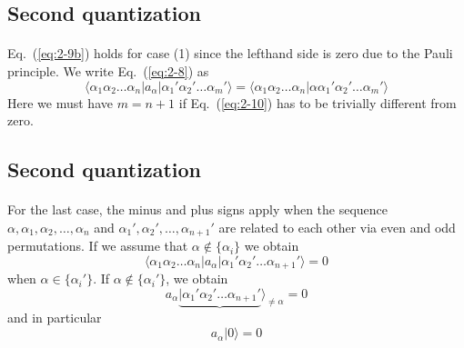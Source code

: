 \documentclass[%
twoside,                 %
final,                   %
10pt]{article}
\begin{document}
\subsection*{Second quantization}

\paragraph{}
Eq.~(\ref{eq:2-9b}) holds for case (1) since the lefthand side is zero due to the Pauli principle. We write
Eq.~(\ref{eq:2-8}) as
\begin{equation}
	\langle\alpha_1\alpha_2 \dots \alpha_n|a_\alpha|\alpha_1'\alpha_2' \dots \alpha_m'\rangle = 
	\langle \alpha_1\alpha_2 \dots \alpha_n|\alpha\alpha_1'\alpha_2' \dots \alpha_m'\rangle \label{eq:2-10}
\end{equation}
Here we must have $m = n+1$ if Eq.~(\ref{eq:2-10}) has to be trivially different from zero.




\subsection*{Second quantization}

\paragraph{}
For the last case, the minus and plus signs apply when the sequence 
$\alpha ,\alpha_1, \alpha_2, \dots, \alpha_n$ and 
$\alpha_1', \alpha_2', \dots, \alpha_{n+1}'$ are related to each other via even and odd permutations.
If we assume that  $\alpha \notin \{\alpha_i\}$ we obtain 
\begin{equation}
	\langle\alpha_1\alpha_2 \dots \alpha_n|a_\alpha|\alpha_1'\alpha_2' \dots \alpha_{n+1}'\rangle = 0 \label{eq:2-12}
\end{equation}
when $\alpha \in \{\alpha_i'\}$. If $\alpha \notin \{\alpha_i'\}$, we obtain
\begin{equation}
	a_\alpha\underbrace{|\alpha_1'\alpha_2' \dots \alpha_{n+1}'}\rangle_{\neq \alpha} = 0 \label{eq:2-13a}
\end{equation}
and in particular
\begin{equation}
	a_\alpha |0\rangle = 0 \label{eq:2-13b}
\end{equation}
\end{document}
